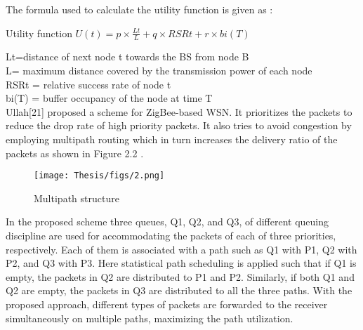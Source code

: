 The formula used to calculate the utility function is given as :
{\begin{center}
     Utility function $U(t)=p\times \frac{Lt}{L}+q \times RSRt+r \times bi(T)$
\end{center}}
Lt=distance of next node t towards the BS from node B\\
L= maximum distance covered by the transmission power of each node\\ 
RSRt = relative success rate of node t\\
bi(T) = buffer occupancy of the node at time T\\
Ullah[21] proposed a scheme for ZigBee-based WSN. It prioritizes the packets to reduce the drop rate of high priority packets.
It also tries to avoid congestion by employing multipath routing which in turn increases the delivery ratio of the packets as shown in Figure 2.2 .
\begin{figure}[h!]
    \centering
    \texttt{[image: Thesis/figs/2.png]}
    \caption{Multipath structure}
    \label{fig:my_label}
\end{figure}
In the proposed scheme three queues, Q1, Q2, and Q3, of different queuing discipline are used for accommodating the packets of each of three priorities, respectively. Each of them is associated with a path such as Q1 with P1, Q2 with P2, and Q3 with P3. Here statistical path scheduling is applied such that if Q1 is empty, the packets in Q2 are distributed to P1 and P2. Similarly, if both Q1 and Q2 are empty, the packets in Q3 are distributed to all the three paths. With the proposed approach, different types of packets are forwarded to the receiver simultaneously on multiple paths, maximizing the path utilization. 
